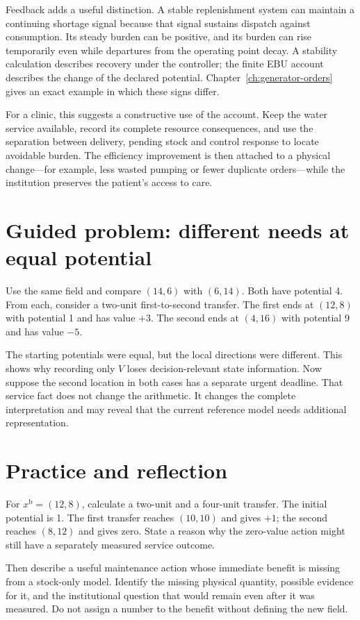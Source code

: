 Feedback adds a useful distinction. A stable replenishment system can maintain a continuing shortage signal because that signal sustains dispatch against consumption. Its steady burden can be positive, and its burden can rise temporarily even while departures from the operating point decay. A stability calculation describes recovery under the controller; the finite EBU account describes the change of the declared potential. Chapter~\ref{ch:generator-orders} gives an exact example in which these signs differ.

For a clinic, this suggests a constructive use of the account. Keep the water service available, record its complete resource consequences, and use the separation between delivery, pending stock and control response to locate avoidable burden. The efficiency improvement is then attached to a physical change---for example, less wasted pumping or fewer duplicate orders---while the institution preserves the patient's access to care.

\section{Guided problem: different needs at equal potential}
Use the same field and compare $(14,6)$ with $(6,14)$. Both have potential 4. From each, consider a two-unit first-to-second transfer. The first ends at $(12,8)$ with potential 1 and has value $+3$. The second ends at $(4,16)$ with potential 9 and has value $-5$.

The starting potentials were equal, but the local directions were different. This shows why recording only $V$ loses decision-relevant state information. Now suppose the second location in both cases has a separate urgent deadline. That service fact does not change the arithmetic. It changes the complete interpretation and may reveal that the current reference model needs additional representation.

\section{Practice and reflection}
For $x^{\mathrm{b}}=(12,8)$, calculate a two-unit and a four-unit transfer. The initial potential is 1. The first transfer reaches $(10,10)$ and gives $+1$; the second reaches $(8,12)$ and gives zero. State a reason why the zero-value action might still have a separately measured service outcome.

Then describe a useful maintenance action whose immediate benefit is missing from a stock-only model. Identify the missing physical quantity, possible evidence for it, and the institutional question that would remain even after it was measured. Do not assign a number to the benefit without defining the new field.

